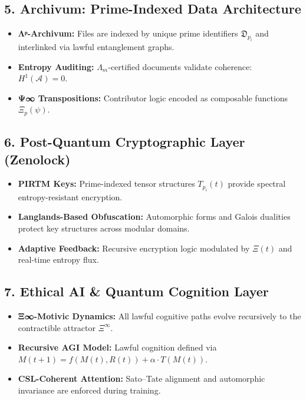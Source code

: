 \documentclass[12]{amsart}
\theoremstyle{plain}
\begin{document}
\subsection{5. Archivum: Prime-Indexed Data Architecture}
\begin{itemize}
  \item \textbf{Λᵖ-Archivum:} Files are indexed by unique prime identifiers $\mathfrak{D}_{p_i}$ and interlinked via lawful entanglement graphs.
  \item \textbf{Entropy Auditing:} $\Lambda_m$-certified documents validate coherence: $H^1(\mathcal{A}) = 0$.
  \item \textbf{Ψ∞ Transpositions:} Contributor logic encoded as composable functions $\Xi_p(\psi)$.
\end{itemize}

\subsection{6. Post-Quantum Cryptographic Layer (Zenolock)}
\begin{itemize}
  \item \textbf{PIRTM Keys:} Prime-indexed tensor structures $T_{p_i}(t)$ provide spectral entropy-resistant encryption.
  \item \textbf{Langlands-Based Obfuscation:} Automorphic forms and Galois dualities protect key structures across modular domains.
  \item \textbf{Adaptive Feedback:} Recursive encryption logic modulated by $\Xi(t)$ and real-time entropy flux.
\end{itemize}

\subsection{7. Ethical AI & Quantum Cognition Layer}
\begin{itemize}
  \item \textbf{Ξ∞-Motivic Dynamics:} All lawful cognitive paths evolve recursively to the contractible attractor $\Xi^\infty$.
  \item \textbf{Recursive AGI Model:} Lawful cognition defined via $M(t+1) = f(M(t), R(t)) + \alpha \cdot T(M(t))$.
  \item \textbf{CSL-Coherent Attention:} Sato–Tate alignment and automorphic invariance are enforced during training.
\end{itemize}
\end{document}
